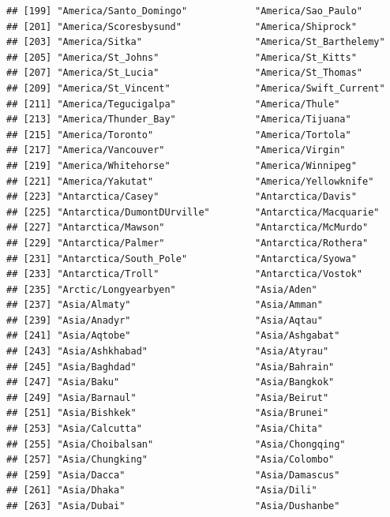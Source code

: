 \documentclass[
]{book}
\begin{document}
\begin{verbatim}
## [199] "America/Santo_Domingo"            "America/Sao_Paulo"               
## [201] "America/Scoresbysund"             "America/Shiprock"                
## [203] "America/Sitka"                    "America/St_Barthelemy"           
## [205] "America/St_Johns"                 "America/St_Kitts"                
## [207] "America/St_Lucia"                 "America/St_Thomas"               
## [209] "America/St_Vincent"               "America/Swift_Current"           
## [211] "America/Tegucigalpa"              "America/Thule"                   
## [213] "America/Thunder_Bay"              "America/Tijuana"                 
## [215] "America/Toronto"                  "America/Tortola"                 
## [217] "America/Vancouver"                "America/Virgin"                  
## [219] "America/Whitehorse"               "America/Winnipeg"                
## [221] "America/Yakutat"                  "America/Yellowknife"             
## [223] "Antarctica/Casey"                 "Antarctica/Davis"                
## [225] "Antarctica/DumontDUrville"        "Antarctica/Macquarie"            
## [227] "Antarctica/Mawson"                "Antarctica/McMurdo"              
## [229] "Antarctica/Palmer"                "Antarctica/Rothera"              
## [231] "Antarctica/South_Pole"            "Antarctica/Syowa"                
## [233] "Antarctica/Troll"                 "Antarctica/Vostok"               
## [235] "Arctic/Longyearbyen"              "Asia/Aden"                       
## [237] "Asia/Almaty"                      "Asia/Amman"                      
## [239] "Asia/Anadyr"                      "Asia/Aqtau"                      
## [241] "Asia/Aqtobe"                      "Asia/Ashgabat"                   
## [243] "Asia/Ashkhabad"                   "Asia/Atyrau"                     
## [245] "Asia/Baghdad"                     "Asia/Bahrain"                    
## [247] "Asia/Baku"                        "Asia/Bangkok"                    
## [249] "Asia/Barnaul"                     "Asia/Beirut"                     
## [251] "Asia/Bishkek"                     "Asia/Brunei"                     
## [253] "Asia/Calcutta"                    "Asia/Chita"                      
## [255] "Asia/Choibalsan"                  "Asia/Chongqing"                  
## [257] "Asia/Chungking"                   "Asia/Colombo"                    
## [259] "Asia/Dacca"                       "Asia/Damascus"                   
## [261] "Asia/Dhaka"                       "Asia/Dili"                       
## [263] "Asia/Dubai"                       "Asia/Dushanbe"                   

\end{verbatim}
\end{document}

